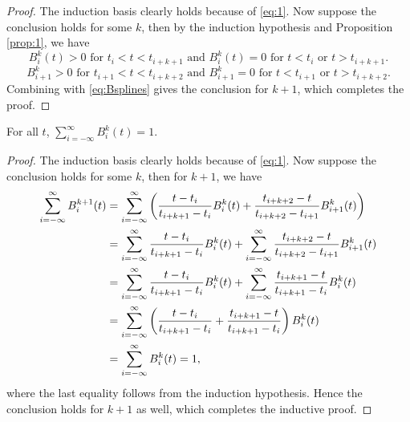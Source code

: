 \begin{sol}
  \begin{proof}
    The induction basis clearly holds because of \eqref{eq:1}.
    Now suppose the conclusion holds for some $k$,
    then by the induction hypothesis and Proposition \ref{prop:1},
    we have
    \begin{displaymath}
      B_i^k(t)>0 \text{ for } t_i<t<t_{i+k+1} \text{ and }
      B_i^k(t)=0 \text{ for } t<t_i \text{ or } t>t_{i+k+1}.
    \end{displaymath}
    \begin{displaymath}
      B_{i+1}^k>0 \text{ for } t_{i+1}<t<t_{i+k+2} \text{ and }
      B_{i+1}^k=0 \text{ for } t<t_{i+1} \text{ or } t>t_{i+k+2}.
    \end{displaymath}
    Combining with \eqref{eq:Bsplines} gives the conclusion for $k+1$,
    which completes the proof.
  \end{proof}

  \begin{prop}
    For all $t$, $\sum_{i=-\infty}^{\infty}B_i^k(t)=1$.
  \end{prop}
  \begin{proof}
    The induction basis clearly holds because of \eqref{eq:1}.
    Now suppose the conclusion holds for some $k$,
    then for $k+1$,
    we have
    \begin{align*}
      \sum_{i=-\infty}^{\infty}B_i^{k+1}(t) &= \sum_{i=-\infty}^{\infty}
      \left(\frac{t-t_i}{t_{i+k+1}-t_{i}}B_i^k(t) +
                                              \frac{t_{i+k+2}-t}{t_{i+k+2}-t_{i+1}}B_{i+1}^{k}(t)\right) \\
                                            &= \sum_{i=-\infty}^{\infty}\frac{t-t_i}{t_{i+k+1}-t_i}B_i^k(t) +
                                              \sum_{i=-\infty}^{\infty}\frac{t_{i+k+2}-t}{t_{i+k+2}-t_{i+1}}B_{i+1}^k(t) \\
      &= \sum_{i=-\infty}^{\infty}\frac{t-t_i}{t_{i+k+1}-t_i}B_i^k(t) +
        \sum_{i=-\infty}^{\infty}\frac{t_{i+k+1}-t}{t_{i+k+1}-t_i}B_i^k(t)  \\
      &= \sum_{i=-\infty}^{\infty}\left(\frac{t-t_i}{t_{i+k+1}-t_i}+
        \frac{t_{i+k+1}-t}{t_{i+k+1}-t_i}\right) B_i^k(t) \\
                                            &= \sum_{i=-\infty}^{\infty}B_i^k(t)= 1,
    \end{align*}
    where the last equality follows from the induction hypothesis.
    Hence the conclusion holds for $k+1$ as well,
    which completes the inductive proof.
  \end{proof}


\end{sol}
